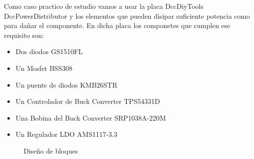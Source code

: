 
Como caso practico de estudio vamos a usar la placa DccDiyTools DccPowerDistributor y los elementos que
pueden disipar suficiente potencia como para dañar el componente. En dicha placa los 
componetes que cumplen ese requisito son:
\begin{itemize}
    \item Dos diodos GS1510FL
    \item Un Mosfet BSS308
    \item Un puente de diodos KMB26STR
    \item Un Controlador de Buck Converter TPS54331D
    \item Una Bobina del Buck Converter SRP1038A-220M
    \item Un Regulador LDO AMS1117-3.3
\end{itemize}

\begin{figure}[H]
    \centering
    
    \caption{Diseño de bloques}
    \label{fig:Bloques}
\end{figure}
